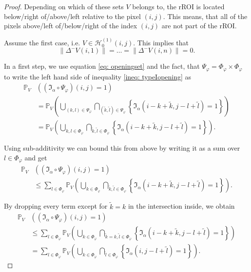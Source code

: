 \documentclass[a4paper,12pt]{article}
\newcommand{\norm}[1]{\lVert#1\rVert}
\theoremstyle{plain}
\theoremstyle{definition}
\begin{document}
\begin{proof}
	Depending on which of these sets $V$ belongs to, the rROI is located below/right of/above/left relative to the pixel $(i, j)$. This means, that all of the pixels above/left of/below/right of the index $(i, j)$ are not part of the rROI.
	
	Assume the first case, i.e. $V \in \mathcal{H}_0^{(1)}(i, j)$. This implies that
	\begin{equation*}
		\norm{\Delta^- V(i, 1)} = \ldots = \norm{\Delta^- V(i, n)} = 0.
	\end{equation*}
	
	In a first step, we use equation \eqref{eq: openingset} and the fact, that $\Psi_\varphi = \Phi_\varphi \times \Phi_\varphi$ to write the left hand side of inequality \eqref{ineq: typeIopening} as
	\begin{align*}
		\mathbb{P}_V&\left( (\mathfrak{I}_\alpha \circ \Psi_\varphi)(i, j) = 1 \right) \\
		&= \mathbb{P}_V\left( \bigcup_{(k, l) \in \Psi_\varphi} \bigcap_{(\tilde{k}, \tilde{l}) \in \Psi_\varphi} \left\{ \mathfrak{I}_\alpha(i - k + \tilde{k}, j - l + \tilde{l}) = 1 \right\} \right) \\
		&= \mathbb{P}_V\left( \bigcup_{k, l \in \Phi_\varphi} \bigcap_{\tilde{k}, \tilde{l} \in \Phi_\varphi} \left\{ \mathfrak{I}_\alpha(i - k + \tilde{k}, j - l + \tilde{l}) = 1 \right\} \right).
	\end{align*}
	
	Using sub-additivity we can bound this from above by writing it as a sum over $l \in \Phi_\varphi$ and get
	\begin{align*}
		\mathbb{P}_V&\left( (\mathfrak{I}_\alpha \circ \Psi_\varphi)(i, j) = 1 \right) \\
		&\leq \sum_{l \in \Phi_\varphi} \mathbb{P}_V\left( \bigcup_{k \in \Phi_\varphi} \bigcap_{\tilde{k}, \tilde{l} \in \Phi_\varphi} \left\{ \mathfrak{I}_\alpha(i - k + \tilde{k}, j - l + \tilde{l}) = 1 \right\} \right).
	\end{align*}
	
	By dropping every term except for $\tilde{k} = k$ in the intersection inside, we obtain
	\begin{align*}
		\mathbb{P}_V&\left( (\mathfrak{I}_\alpha \circ \Psi_\varphi)(i, j) = 1 \right) \\
		&\leq \sum_{l \in \Phi_\varphi} \mathbb{P}_V\left( \bigcup_{k \in \Phi_\varphi} \bigcap_{\tilde{k} = k, \tilde{l} \in \Phi_\varphi} \left\{ \mathfrak{I}_\alpha(i - k + \tilde{k}, j - l + \tilde{l}) = 1 \right\} \right) \\
		&= \sum_{l \in \Phi_\varphi} \mathbb{P}_V\left( \bigcup_{k \in \Phi_\varphi} \bigcap_{\tilde{l} \in \Phi_\varphi} \left\{ \mathfrak{I}_\alpha(i, j - l + \tilde{l}) = 1 \right\} \right).
	\end{align*}
	

\end{proof}
\end{document}

